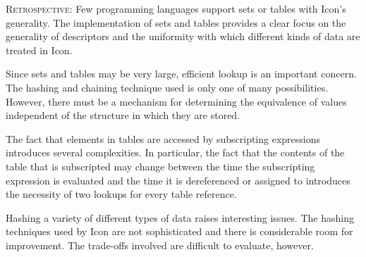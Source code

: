 \textsc{Retrospective}: Few programming languages support sets or
tables with Icon's generality. The implementation of sets and tables
provides a clear focus on the generality of descriptors and the
uniformity with which different kinds of data are treated in Icon.

Since sets and tables may be very large, efficient lookup is an
important concern. The hashing and chaining technique used is only one
of many possibilities. However, there must be a mechanism for
determining the equivalence of values independent of the structure in
which they are stored.

The fact that elements in tables are accessed by subscripting
expressions introduces several complexities. In particular, the fact
that the contents of the table that is subscripted may change between
the time the subscripting expression is evaluated and the time it is
dereferenced or assigned to introduces the necessity of two lookups
for every table reference.

Hashing a variety of different types of data raises interesting
issues. The hashing techniques used by Icon are not sophisticated and
there is considerable room for improvement. The trade-offs involved
are difficult to evaluate, however.

